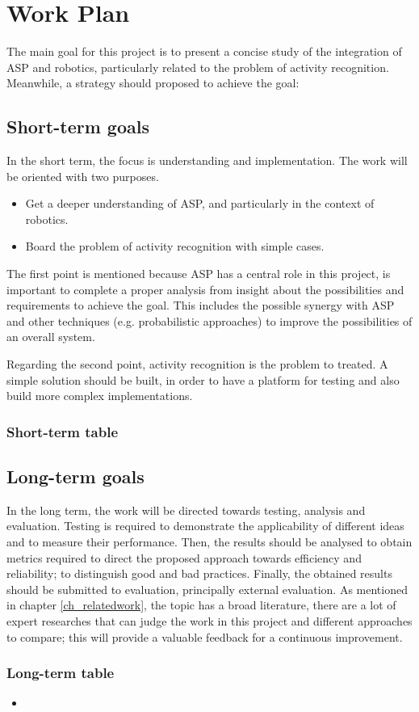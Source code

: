 \chapter{Work Plan}

The main goal for this project is to present a concise study of the integration of ASP and robotics, particularly related to the problem of activity recognition.
Meanwhile, a strategy should proposed to achieve the goal:


\section{Short-term goals}

In the short term, the focus is understanding and implementation.
The work will be oriented with two purposes.

\begin{itemize}
\item Get a deeper understanding of ASP, and particularly in the context of robotics.
\item Board the problem of activity recognition with simple cases.
\end{itemize}

The first point is mentioned because ASP has a central role in this project, is important to complete a proper analysis from insight about the possibilities and requirements to achieve the goal.
This includes the possible synergy with ASP and other techniques (e.g. probabilistic approaches) to improve the possibilities of an overall system.

Regarding the second point, activity recognition is the problem to treated.
A simple solution should be built, in order to have a platform for testing and also build more complex implementations.

\subsection{Short-term table}

\section{Long-term goals}

In the long term, the work will be directed towards testing, analysis and evaluation. 
Testing is required to demonstrate the applicability of different ideas and to measure their performance.
Then, the results should be analysed to obtain metrics required to direct the proposed approach towards efficiency and reliability; to distinguish good and bad practices.
Finally, the obtained results should be submitted to evaluation, principally external evaluation.
As mentioned in chapter \ref{ch_relatedwork}, the topic has a broad literature, there are a lot of expert researches that can judge the work in this project and different approaches to compare; this will provide a valuable feedback for a continuous improvement.

\subsection{Long-term table}

\begin{itemize}
\item 
\end{itemize}


